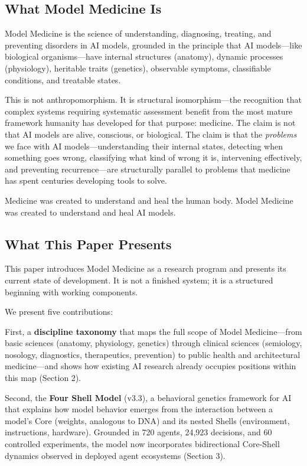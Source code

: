 \documentclass[11pt]{article}
\begin{document}
\subsection{What Model Medicine Is}

Model Medicine is the science of understanding, diagnosing, treating, and preventing disorders in AI models, grounded in the principle that AI models---like biological organisms---have internal structures (anatomy), dynamic processes (physiology), heritable traits (genetics), observable symptoms, classifiable conditions, and treatable states.

This is not anthropomorphism. It is structural isomorphism---the recognition that complex systems requiring systematic assessment benefit from the most mature framework humanity has developed for that purpose: medicine. The claim is not that AI models are alive, conscious, or biological. The claim is that the \emph{problems} we face with AI models---understanding their internal states, detecting when something goes wrong, classifying what kind of wrong it is, intervening effectively, and preventing recurrence---are structurally parallel to problems that medicine has spent centuries developing tools to solve.

Medicine was created to understand and heal the human body. Model Medicine was created to understand and heal AI models.

\subsection{What This Paper Presents}

This paper introduces Model Medicine as a research program and presents its current state of development. It is not a finished system; it is a structured beginning with working components.

We present five contributions:

First, a \textbf{discipline taxonomy} that maps the full scope of Model Medicine---from basic sciences (anatomy, physiology, genetics) through clinical sciences (semiology, nosology, diagnostics, therapeutics, prevention) to public health and architectural medicine---and shows how existing AI research already occupies positions within this map (Section 2).

Second, the \textbf{Four Shell Model} (v3.3), a behavioral genetics framework for AI that explains how model behavior emerges from the interaction between a model's Core (weights, analogous to DNA) and its nested Shells (environment, instructions, hardware). Grounded in 720 agents, 24,923 decisions, and 60 controlled experiments, the model now incorporates bidirectional Core-Shell dynamics observed in deployed agent ecosystems (Section 3).
\end{document}
